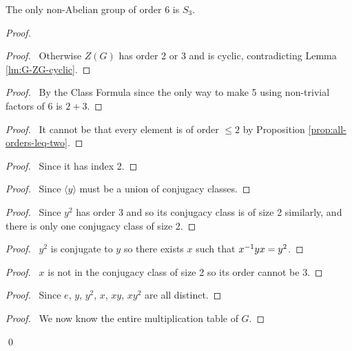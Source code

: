 \begin{ex}
The only non-Abelian group of order 6 is $S_3$.
\end{ex}

\begin{proof}
\pf
{}
\begin{proof}
	\pf\ Otherwise $Z(G)$ has order 2 or 3 and is cyclic, contradicting Lemma \ref{lm:G-ZG-cyclic}.
\end{proof}
\begin{proof}
	\pf\ By the Class Formula since the only way to make 5 using non-trivial factors of 6 is $2+3$.
\end{proof}
\begin{proof}
	\pf\ It cannot be that every element is of order $\leq 2$ by Proposition \ref{prop:all-orders-leq-two}.
\end{proof}
\begin{proof}
	\pf\ Since it has index 2.
\end{proof}
\begin{proof}
	\pf\ Since $\langle y \rangle$ must be a union of conjugacy classes.
\end{proof}
\begin{proof}
	\pf\ Since $y^2$ has order 3 and so its conjugacy class is of size 2 similarly, and there is only one conjugacy class of size 2.
\end{proof}
\begin{proof}
	\pf\ $y^2$ is conjugate to $y$ so there exists $x$ such that ${x}^{-1}yx = y^2$.
\end{proof}
\begin{proof}
	\pf\ $x$ is not in the conjugacy class of size 2 so its order cannot be 3.
\end{proof}
\begin{proof}
	\pf\ Since $e$, $y$, $y^2$, $x$, $xy$, $xy^2$ are all distinct.
\end{proof}
\begin{proof}
	\pf\ We now know the entire multiplication table of $G$.
\end{proof}
\qed
\end{proof}


